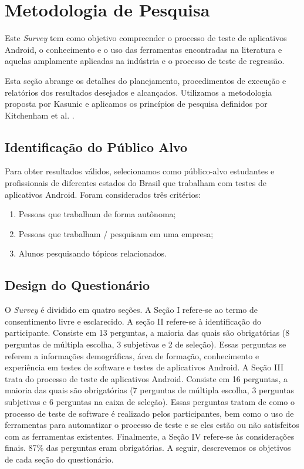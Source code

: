 \section{Metodologia de Pesquisa}\label{rmsurvey}

Este \textit{Survey} tem como objetivo compreender o processo de teste de aplicativos Android, o conhecimento e o uso das ferramentas encontradas na literatura e aquelas amplamente aplicadas na indústria e o processo de teste de regressão. 

Esta seção abrange os detalhes do planejamento, procedimentos de execução e relatórios dos resultados desejados e alcançados. Utilizamos a metodologia proposta por Kasunic \cite{Kasunic2005DesigningAE} e aplicamos os princípios de pesquisa definidos por Kitchenham et al. \cite{Kitchenham:2002:PSR:566493.566495}.


\subsection{Identificação do Público Alvo}

Para obter resultados válidos, selecionamos como público-alvo estudantes e profissionais de diferentes estados do Brasil que trabalham com testes de aplicativos Android. Foram considerados três critérios:

\begin{enumerate}
    \item Pessoas que trabalham de forma autônoma; 
    \item Pessoas que trabalham / pesquisam em uma empresa; 
    \item Alunos pesquisando tópicos relacionados.
\end{enumerate}

\subsection{Design do Questionário}


O \textit{Survey} é dividido em quatro seções. A Seção I refere-se ao termo de consentimento livre e esclarecido. A seção II refere-se à identificação do participante. Consiste em 13 perguntas, a maioria das quais são obrigatórias (8 perguntas de múltipla escolha, 3 subjetivas e 2 de seleção). Essas perguntas se referem a informações demográficas, área de formação, conhecimento e experiência em testes de software e testes de aplicativos Android. A Seção III trata do processo de teste de aplicativos Android. Consiste em 16 perguntas, a maioria das quais são obrigatórias (7 perguntas de múltipla escolha, 3 perguntas subjetivas e 6 perguntas na caixa de seleção). Essas perguntas tratam de como o processo de teste de software é realizado pelos participantes, bem como o uso de ferramentas para automatizar o processo de teste e se eles estão ou não satisfeitos com as ferramentas existentes. Finalmente, a Seção IV refere-se às considerações finais. 87\% das perguntas eram obrigatórias. A seguir, descrevemos os objetivos de cada seção do questionário.


